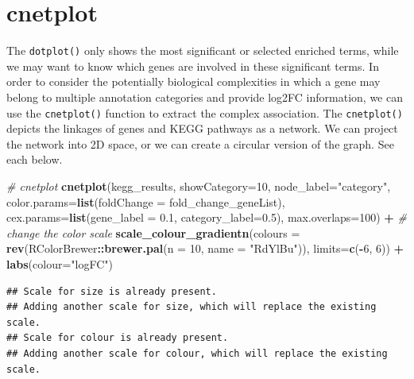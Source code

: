 \documentclass[
]{book}
\newenvironment{Shaded}{\begin{snugshade}}{\end{snugshade}}
\newcommand{\AttributeTok}[1]{\textcolor[rgb]{0.13,0.29,0.53}{#1}}
\newcommand{\CommentTok}[1]{\textcolor[rgb]{0.56,0.35,0.01}{\textit{#1}}}
\newcommand{\DecValTok}[1]{\textcolor[rgb]{0.00,0.00,0.81}{#1}}
\newcommand{\FloatTok}[1]{\textcolor[rgb]{0.00,0.00,0.81}{#1}}
\newcommand{\FunctionTok}[1]{\textcolor[rgb]{0.13,0.29,0.53}{\textbf{#1}}}
\newcommand{\NormalTok}[1]{#1}
\newcommand{\SpecialCharTok}[1]{\textcolor[rgb]{0.81,0.36,0.00}{\textbf{#1}}}
\newcommand{\StringTok}[1]{\textcolor[rgb]{0.31,0.60,0.02}{#1}}
\begin{document}
\hypertarget{cnetplot}{%
\section{cnetplot}\label{cnetplot}}

The \texttt{dotplot()} only shows the most significant or selected enriched terms, while we may want to know which genes are involved in these significant terms. In order to consider the potentially biological complexities in which a gene may belong to multiple annotation categories and provide log2FC information, we can use the \texttt{cnetplot()} function to extract the complex association. The \texttt{cnetplot()} depicts the linkages of genes and KEGG pathways as a network. We can project the network into 2D space, or we can create a circular version of the graph. See each below.

\begin{Shaded}
\begin{Highlighting}[]
\CommentTok{\# cnetplot}
\FunctionTok{cnetplot}\NormalTok{(kegg\_results,  }
         \AttributeTok{showCategory=}\DecValTok{10}\NormalTok{,}
         \AttributeTok{node\_label=}\StringTok{"category"}\NormalTok{,}
         \AttributeTok{color.params=}\FunctionTok{list}\NormalTok{(}\AttributeTok{foldChange =}\NormalTok{ fold\_change\_geneList),}
         \AttributeTok{cex.params=}\FunctionTok{list}\NormalTok{(}\AttributeTok{gene\_label =} \FloatTok{0.1}\NormalTok{,}
                         \AttributeTok{category\_label=}\FloatTok{0.5}\NormalTok{), }
         \AttributeTok{max.overlaps=}\DecValTok{100}\NormalTok{) }\SpecialCharTok{+}
  \CommentTok{\# change the color scale}
  \FunctionTok{scale\_colour\_gradientn}\NormalTok{(}\AttributeTok{colours =} \FunctionTok{rev}\NormalTok{(RColorBrewer}\SpecialCharTok{::}\FunctionTok{brewer.pal}\NormalTok{(}\AttributeTok{n =} \DecValTok{10}\NormalTok{, }\AttributeTok{name =} \StringTok{"RdYlBu"}\NormalTok{)), }\AttributeTok{limits=}\FunctionTok{c}\NormalTok{(}\SpecialCharTok{{-}}\DecValTok{6}\NormalTok{, }\DecValTok{6}\NormalTok{)) }\SpecialCharTok{+}
  \FunctionTok{labs}\NormalTok{(}\AttributeTok{colour=}\StringTok{"logFC"}\NormalTok{)}
\end{Highlighting}
\end{Shaded}

\begin{verbatim}
## Scale for size is already present.
## Adding another scale for size, which will replace the existing scale.
## Scale for colour is already present.
## Adding another scale for colour, which will replace the existing scale.
\end{verbatim}
\end{document}

